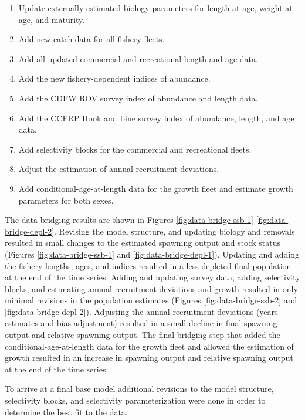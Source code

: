 \documentclass[11pt,
  english,
  letterpaper,
]{article}
\providecommand{\tightlist}{%
  \setlength{\itemsep}{0pt}\setlength{\parskip}{0pt}}
\providecommand{\tightlist}{%
  \setlength{\itemsep}{0pt}\setlength{\parskip}{0pt}}
\begin{document}
\begin{enumerate}
\def\labelenumi{\arabic{enumi}.}
\tightlist
\item
  Update externally estimated biology parameters for length-at-age, weight-at-age, and maturity.
\item
  Add new catch data for all fishery fleets.
\item
  Add all updated commercial and recreational length and age data.
\item
  Add the new fishery-dependent indices of abundance.
\item
  Add the CDFW ROV survey index of abundance and length data.
\item
  Add the CCFRP Hook and Line survey index of abundance, length, and age data.
\item
  Add selectivity blocks for the commercial and recreational fleets.
\item
  Adjust the estimation of annual recruitment deviations.
\item
  Add conditional-age-at-length data for the growth fleet and estimate growth parameters for both sexes.
\end{enumerate}

The data bridging results are shown in Figures \ref{fig:data-bridge-ssb-1}-\ref{fig:data-bridge-depl-2}. Revising the model structure, and updating biology and removals resulted in small changes to the estimated spawning output and stock status (Figures \ref{fig:data-bridge-ssb-1} and \ref{fig:data-bridge-depl-1}). Updating and adding the fishery lengths, ages, and indices resulted in a less depleted final population at the end of the time series. Adding and updating survey data, adding selectivity blocks, and estimating annual recruitment deviations and growth resulted in only minimal revisions in the population estimates (Figures \ref{fig:data-bridge-ssb-2} and \ref{fig:data-bridge-depl-2}). Adjusting the annual recruitment deviations (years estimates and bias adjustment) resulted in a small decline in final spawning output and relative spawning output. The final bridging step that added the conditional-age-at-length data for the growth fleet and allowed the estimation of growth resulted in an increase in spawning output and relative spawning output at the end of the time series.

To arrive at a final base model additional revisions to the model structure, selectivity blocks, and selectivity parameterization were done in order to determine the best fit to the data.
\end{document}
